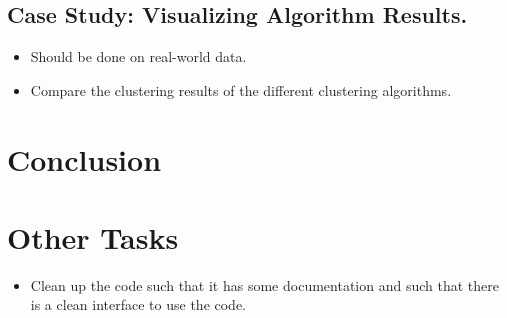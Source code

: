 \documentclass[twoside,leqno,twocolumn]{article}
\theoremstyle{definition}
\begin{document}
\subsection{Case Study: Visualizing Algorithm Results.}
\begin{itemize}
	\item Should be done on real-world data.
	\item Compare the clustering results of the different clustering algorithms.
\end{itemize}

\section{Conclusion}

\section{Other Tasks}
\begin{itemize}
	\item Clean up the code such that it has some documentation and such that
		there is a clean interface to use the code.
\end{itemize}

 



\end{document}
